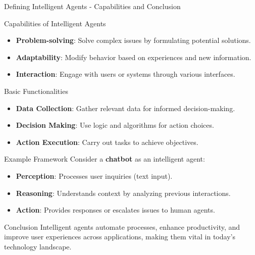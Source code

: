 \documentclass[aspectratio=169]{beamer}
\begin{document}
\begin{frame}[fragile]{Defining Intelligent Agents - Capabilities and Conclusion}
    \begin{block}{Capabilities of Intelligent Agents}
        \begin{itemize}
            \item \textbf{Problem-solving}: Solve complex issues by formulating potential solutions.
            \item \textbf{Adaptability}: Modify behavior based on experiences and new information.
            \item \textbf{Interaction}: Engage with users or systems through various interfaces.
        \end{itemize}
    \end{block}
    
    \begin{block}{Basic Functionalities}
        \begin{itemize}
            \item \textbf{Data Collection}: Gather relevant data for informed decision-making.
            \item \textbf{Decision Making}: Use logic and algorithms for action choices.
            \item \textbf{Action Execution}: Carry out tasks to achieve objectives.
        \end{itemize}
    \end{block}

    \begin{block}{Example Framework}
        Consider a \textbf{chatbot} as an intelligent agent:
        \begin{itemize}
            \item \textbf{Perception}: Processes user inquiries (text input).
            \item \textbf{Reasoning}: Understands context by analyzing previous interactions.
            \item \textbf{Action}: Provides responses or escalates issues to human agents.
        \end{itemize}
    \end{block}

    \begin{block}{Conclusion}
        Intelligent agents automate processes, enhance productivity, and improve user experiences across applications, making them vital in today's technology landscape.
    \end{block}
\end{frame}
\end{document}
